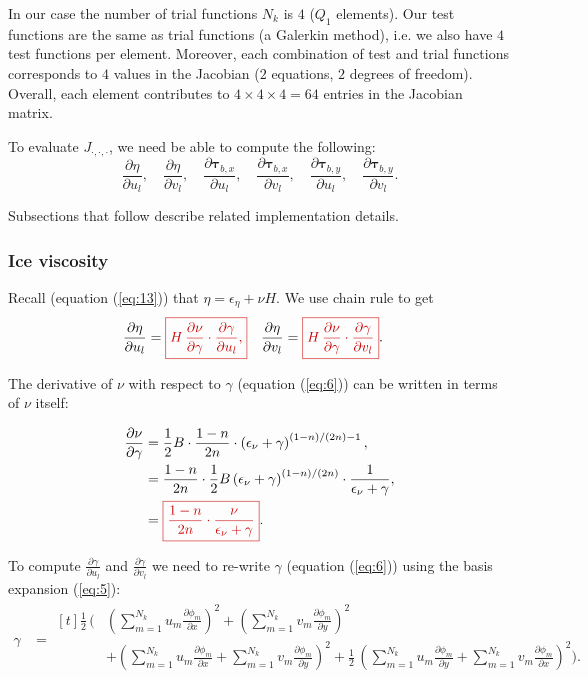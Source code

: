 \documentclass{amsart}
\newcommand{\diff}[2]{\ensuremath{\frac{\partial #1}{\partial #2}}}
\newcommand{\diffbasisexpansion}[3]{\ensuremath{\sum_{#3 = 1}^{N_k} {#1}_{#3} \diff{\phi_{#3}}{#2} }}
\newcommand{\UX}{\diffbasisexpansion{u}{x}{m}}
\newcommand{\UY}{\diffbasisexpansion{u}{y}{m}}
\newcommand{\VX}{\diffbasisexpansion{v}{x}{m}}
\newcommand{\VY}{\diffbasisexpansion{v}{y}{m}}
\newcommand{\basalshearstress}[1]{\boldsymbol{\tau}_{b#1}}
\newcommand{\taubx}{\basalshearstress{,x}}
\newcommand{\tauby}{\basalshearstress{,y}}
\newcommand{\highlight}[1]{{\color{red!80!black} \fbox{$ \displaystyle #1 $} }}
\begin{document}
In our case the number of trial functions $N_k$ is $4$ ($Q_1$ elements). Our test functions are the same as trial functions (a Galerkin method), i.e. we also have $4$ test functions per element. Moreover, each combination of test and trial functions corresponds to $4$ values in the Jacobian ($2$ equations, $2$ degrees of freedom). Overall, each element contributes to $4 \times 4 \times 4 = 64$ entries in the Jacobian matrix.

To evaluate $J_{\cdot,\cdot,\cdot}$, we need be able to compute the following:
\begin{equation*}
  \diff{\eta}{u_l}, \quad \diff{\eta}{v_l}, \quad \diff{\taubx}{u_l},
  \quad \diff{\taubx}{v_l}, \quad \diff{\tauby}{u_l}, \quad \diff{\tauby}{v_l}.
\end{equation*}

Subsections that follow describe related implementation details.


\subsubsection{Ice viscosity}
\label{sec:viscosity-evaluation}

Recall (equation (\ref{eq:13})) that $\eta = \epsilon_{\eta} + \nu H$. We use chain rule to get
\begin{align*}
  \diff{\eta}{u_l} &= \highlight{ H\,\diff{\nu}{\gamma}\cdot \diff{\gamma}{u_l}, } &   \diff{\eta}{v_l} &= \highlight{ H\,\diff{\nu}{\gamma}\cdot \diff{\gamma}{v_l} }.
\end{align*}

The derivative of $\nu$ with respect to $\gamma$ (equation (\ref{eq:6})) can be written in terms of $\nu$ itself:

\begin{align*}
  \diff{\nu}{\gamma} & = \frac{1}{2} B \cdot \frac{1 - n}{2n} \cdot \left(\epsilon_{\nu} + \gamma \right)^{(1 - n) / (2n) - 1}, \\
      & = \frac{1 - n}{2n} \cdot \frac{1}{2} B \left( \epsilon_{\nu} + \gamma \right)^{(1 - n) / (2n)} \cdot \frac{1}{\epsilon_{\nu} + \gamma}, \\
      & = \highlight{ \frac{1 - n}{2n} \cdot \frac{\nu}{\epsilon_{\nu} + \gamma} }.
\end{align*}

To compute $\diff{\gamma}{u_l}$ and $\diff{\gamma}{v_l}$ we need to re-write $\gamma$ (equation (\ref{eq:6})) using the basis expansion (\ref{eq:5}):
\begin{align*}
  \gamma &=
           \begin{aligned}[t]
             \frac{1}{2}\, \Bigg(&\left(\UX\right)^2 + \left(\VY\right)^2 \\
             & + \left(\UX + \VY\right)^2 + \frac{1}{2}\, \left(\UY + \VX\right)^2\Bigg). \\
           \end{aligned}
\end{align*}
\end{document}
